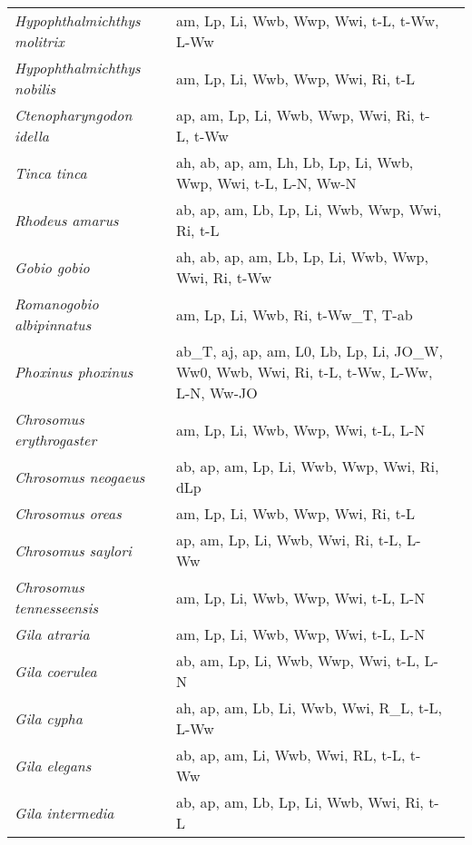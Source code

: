 {\begin{longtable}[c]{p{3.5cm}p{5.5cm}p{5.5cm}}
\emph{Hypophthalmichthys molitrix} &  am, Lp, Li, Wwb, Wwp, Wwi, t-L, t-Ww, L-Ww & \citet{Beel2008,LenaCoul2015,Kami2014} \\
\emph{Hypophthalmichthys nobilis} &  am, Lp, Li, Wwb, Wwp, Wwi, Ri, t-L & \citet{SchrGuy2002} \\
\emph{Ctenopharyngodon idella} &  ap, am, Lp, Li, Wwb, Wwp, Wwi, Ri, t-L, t-Ww & \citet{VenkShet1978} \\
\emph{Tinca tinca} &  ah, ab, ap, am, Lh, Lb, Lp, Li, Wwb, Wwp, Wwi, t-L, L-N, Ww-N & \citet{Beel2008,PompFran2012} \\
\emph{Rhodeus amarus} &  ab, ap, am, Lb, Lp, Li, Wwb, Wwp, Wwi, Ri, t-L & \citet{SmitReic2013,BattStoi2005,Kone2012} \\
\emph{Gobio gobio} &  ah, ab, ap, am, Lb, Lp, Li, Wwb, Wwp, Wwi, Ri, t-Ww & \citet{Beer2005} \\
\emph{Romanogobio albipinnatus} &  am, Lp, Li, Wwb, Ri, t-Ww\_T, T-ab & \citet{WanzWanz1993} \\
\emph{Phoxinus phoxinus} &  ab\_T, aj, ap, am, L0, Lb, Lp, Li, JO\_W, Ww0, Wwb, Wwi, Ri, t-L, t-Ww, L-Ww, L-N, Ww-JO & \citet{KottFrey2007,SchoSchw2000,Frost1943,Bengtsson1974,MuseBorg2002,Mills1987,MuusDahl1968,PlatSarb2013,Hees1984,StalKest1991,Kill2014,MillElor1985,SolhBorg2010} \\
\emph{Chrosomus erythrogaster} &  am, Lp, Li, Wwb, Wwp, Wwi, t-L, L-N & \citet{Sett1974} \\
\emph{Chrosomus neogaeus} &  ab, ap, am, Lp, Li, Wwb, Wwp, Wwi, Ri, dLp & \citet{Stas1978} \\
\emph{Chrosomus oreas} &  am, Lp, Li, Wwb, Wwp, Wwi, Ri, t-L & \citet{ThomHarg2017,Stas1978} \\
\emph{Chrosomus saylori} &  ap, am, Lp, Li, Wwb, Wwi, Ri, t-L, L-Ww & \citet{Whit2012} \\
\emph{Chrosomus tennesseensis} &  am, Lp, Li, Wwb, Wwp, Wwi, t-L, L-N & \citet{HameAlso2009} \\
\emph{Gila atraria} &  am, Lp, Li, Wwb, Wwp, Wwi, t-L, L-N & \citet{Neuh1954,VarlLive1976} \\
\emph{Gila coerulea} &  ab, am, Lp, Li, Wwb, Wwp, Wwi, t-L, L-N & \citet{Bird1975} \\
\emph{Gila cypha} &  ah, ap, am, Lb, Li, Wwb, Wwi, R\_L, t-L, L-Ww & \citet{Hamm1982} \\
\emph{Gila elegans} &  ab, ap, am, Li, Wwb, Wwi, RL, t-L, t-Ww &  \\
\emph{Gila intermedia} &  ab, ap, am, Lb, Lp, Li, Wwb, Wwi, Ri, t-L & \citet{Kuce1978} \\

\end{longtable}}
